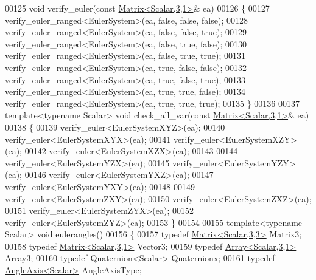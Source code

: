 \begin{DoxyCode}
00125 \textcolor{keywordtype}{void} verify\_euler(\textcolor{keyword}{const} \hyperlink{group___core___module}{Matrix<Scalar,3,1>}& ea)
00126 \{
00127   verify\_euler\_ranged<EulerSystem>(ea, \textcolor{keyword}{false}, \textcolor{keyword}{false}, \textcolor{keyword}{false});
00128   verify\_euler\_ranged<EulerSystem>(ea, \textcolor{keyword}{false}, \textcolor{keyword}{false}, \textcolor{keyword}{true});
00129   verify\_euler\_ranged<EulerSystem>(ea, \textcolor{keyword}{false}, \textcolor{keyword}{true}, \textcolor{keyword}{false});
00130   verify\_euler\_ranged<EulerSystem>(ea, \textcolor{keyword}{false}, \textcolor{keyword}{true}, \textcolor{keyword}{true});
00131   verify\_euler\_ranged<EulerSystem>(ea, \textcolor{keyword}{true}, \textcolor{keyword}{false}, \textcolor{keyword}{false});
00132   verify\_euler\_ranged<EulerSystem>(ea, \textcolor{keyword}{true}, \textcolor{keyword}{false}, \textcolor{keyword}{true});
00133   verify\_euler\_ranged<EulerSystem>(ea, \textcolor{keyword}{true}, \textcolor{keyword}{true}, \textcolor{keyword}{false});
00134   verify\_euler\_ranged<EulerSystem>(ea, \textcolor{keyword}{true}, \textcolor{keyword}{true}, \textcolor{keyword}{true});
00135 \}
00136 
00137 \textcolor{keyword}{template}<\textcolor{keyword}{typename} Scalar> \textcolor{keywordtype}{void} check\_all\_var(\textcolor{keyword}{const} \hyperlink{group___core___module}{Matrix<Scalar,3,1>}& ea)
00138 \{
00139   verify\_euler<EulerSystemXYZ>(ea);
00140   verify\_euler<EulerSystemXYX>(ea);
00141   verify\_euler<EulerSystemXZY>(ea);
00142   verify\_euler<EulerSystemXZX>(ea);
00143   
00144   verify\_euler<EulerSystemYZX>(ea);
00145   verify\_euler<EulerSystemYZY>(ea);
00146   verify\_euler<EulerSystemYXZ>(ea);
00147   verify\_euler<EulerSystemYXY>(ea);
00148   
00149   verify\_euler<EulerSystemZXY>(ea);
00150   verify\_euler<EulerSystemZXZ>(ea);
00151   verify\_euler<EulerSystemZYX>(ea);
00152   verify\_euler<EulerSystemZYZ>(ea);
00153 \}
00154 
00155 \textcolor{keyword}{template}<\textcolor{keyword}{typename} Scalar> \textcolor{keywordtype}{void} eulerangles()
00156 \{
00157   \textcolor{keyword}{typedef} \hyperlink{group___core___module_class_eigen_1_1_matrix}{Matrix<Scalar,3,3>} Matrix3;
00158   \textcolor{keyword}{typedef} \hyperlink{group___core___module}{Matrix<Scalar,3,1>} Vector3;
00159   \textcolor{keyword}{typedef} \hyperlink{group___core___module_class_eigen_1_1_array}{Array<Scalar,3,1>} Array3;
00160   \textcolor{keyword}{typedef} \hyperlink{group___geometry___module_class_eigen_1_1_quaternion}{Quaternion<Scalar>} Quaternionx;
00161   \textcolor{keyword}{typedef} \hyperlink{group___geometry___module_class_eigen_1_1_angle_axis}{AngleAxis<Scalar>} AngleAxisType;

\end{DoxyCode}
